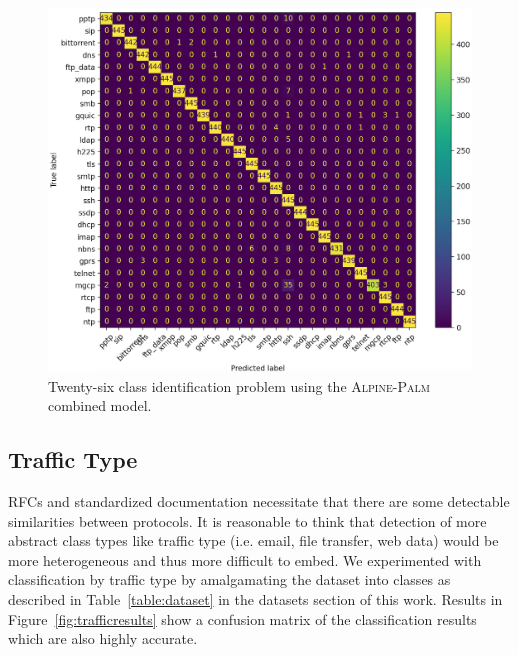\begin{figure} [ht!]
  \centering
  \includegraphics[width=\columnwidth]{chapters/4/img/combined.png}
  \caption{Twenty-six class identification problem using the \textsc{Alpine}-\textsc{Palm} combined model.}
  \label{fig:combined}
\end{figure}

\subsection{Traffic Type}

RFCs and standardized documentation necessitate that there are some detectable similarities between protocols. It is reasonable to think that detection of more abstract class types like traffic type (i.e. email, file transfer, web data) would be more heterogeneous and thus more difficult to embed. We experimented with classification by traffic type by amalgamating the dataset into classes as described in Table~\ref{table:dataset} in the datasets section of this work. Results in Figure~\ref{fig:trafficresults} show a confusion matrix of the classification results which are also highly accurate.


